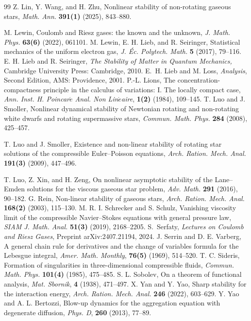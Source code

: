 \documentclass[reqno,11pt]{amsart}
\numberwithin{equation}{section}
\theoremstyle{definition}
\begin{document}
\begin{thebibliography}{99}
Z. Lin, Y. Wang, and H. Zhu,
Nonlinear stability of non-rotating gaseous stars,
{\em Math. Ann.} {\bf 391(1)} (2025), 843--880.
 
 M. Lewin, Coulomb and Riesz gases: the known and the unknown, 
 {\em J. Math. Phys.} {\bf 63(6)} (2022),  061101.
 M. Lewin, E. H. Lieb, and R. Seiringer,
 Statistical mechanics of the uniform electron gas,
 {\em J. Éc. Polytech. Math.} {\bf 5} (2017), 79--116.
 E. H. Lieb and R. Seiringer, {\em The Stability of Matter in Quantum Mechanics,} 
 Cambridge University Press: Cambridge, 2010.
 E.~H. Lieb and M. Loss, {\em Analysis}, Second Edition,
 AMS: Providence, 2001.
P.-L. Lions, The concentration-compactness principle in the calculus of variations: I. The locally compact case,  
{\em Ann. Inst. H. Poincar$\acute{e}$ Anal. Non Lin$\acute{e}$aire}, {\bf 1(2)} (1984), 109--145.
 T. Luo and J. Smoller, Nonlinear dynamical stability of Newtonian rotating and non-rotating white dwarfs 
 and rotating supermassive stars, {\em Commun. Math. Phys.} {\bf 284} (2008), 425--457.

 T. Luo and J. Smoller,
 Existence and non-linear stability of rotating star solutions of the compressible Euler--Poisson equations,
 {\em Arch. Ration. Mech. Anal.} {\bf 191(3)} (2009), 447--496.

 
 T. Luo, Z. Xin, and H. Zeng,
 On nonlinear asymptotic stability of the Lane--Emden solutions for the viscous gaseous star problem,
 {\em Adv. Math.} {\bf 291} (2016), 90--182.
 G. Rein, Non-linear stability of gaseous stars, {\em Arch. Ration. Mech. Anal.} {\bf 168(2)} (2003), 115--130.
 M. R. I. Schrecker and S. Schulz,
 Vanishing viscosity limit of the compressible Navier--Stokes equations with general pressure law,
 {\em {SIAM} J. Math. Anal.} {\bf 51(3)} (2019), 2168--2205.
S.~Serfaty,
{\it Lectures on Coulomb and Riesz Gases}, Preprint arXiv:2407.21194, 2024.
 J. Serrin and D. E. Varberg,
 A general chain rule for derivatives and the change of variables formula for the Lebesgue integral,
 {\em Amer. Math. Monthly}, {\bf 76(5)} (1969), 514--520.
 T. C. Sideris,
 Formation of singularities in three-dimensional compressible fluids,
 {\em Commun. Math. Phys.} {\bf 101(4)} (1985), 475--485.
 S. L. Sobolev,
 On a theorem of functional analysis,
 {\em Mat. Sbornik}, {\bf 4} (1938), 471--497.
 X. Yan and Y. Yao,
 Sharp stability for the interaction energy,
 {\em Arch. Ration. Mech. Anal.} {\bf 246} (2022), 603--629.
Y. Yao and A. L. Bertozzi,
Blow-up dynamics for the aggregation equation with degenerate diffusion,
{\em Phys. D}, {\bf 260} (2013), 77--89.
\end{thebibliography}
\end{document}
